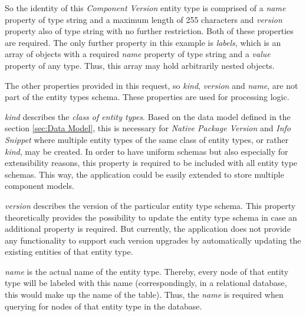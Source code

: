 So the identity of this \emph{Component Version} entity type is comprised of a \emph{name} property of type string and a maximum length of 255 characters and \emph{version} property also of type string with no further restriction. Both of these properties are required. The only further property in this example is \emph{labels}, which is an array of objects with a required \emph{name} property of type string and a \emph{value} property of any type. Thus, this array may hold arbitrarily nested objects.\par 
The other properties provided in this request, so \emph{kind}, \emph{version} and \emph{name}, are not part of the entity types schema. These properties are used for processing logic.\par \emph{kind} describes the \emph{class of entity types}. Based on the data model defined in the section \ref{sec:Data Model}, this is necessary for \emph{Native Package Version} and \emph{Info Snippet} where multiple entity types of the same class of entity types, or rather \emph{kind}, may be created. In order to have uniform schemas but also especially for extensibility reasons, this property is required to be included with all entity type schemas. This way, the application could be easily extended to store multiple component models.\par 
\emph{version} describes the version of the particular entity type schema. This property theoretically provides the possibility to update the entity type schema in case an additional property is required. But currently, the application does not provide any functionality to support such version upgrades by automatically updating the existing entities of that entity type.\par 
\emph{name} is the actual name of the entity type. Thereby, every node of that entity type will be labeled with this name (correspondingly, in a relational database, this would make up the name of the table). Thus, the \emph{name} is required when querying for nodes of that entity type in the database.\\

